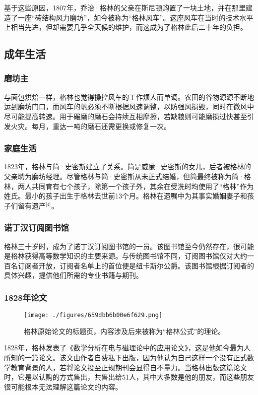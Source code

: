 基于这些原因，1807年，乔治·格林的父亲在斯尼顿购置了一块土地，并在那里建造了一座“砖结构风力磨坊”，如今被称为“格林风车”。这座风车在当时的技术水平上相当先进，但却需要几乎全天候的维护，而这成为了格林此后二十年的负担。
\subsection{成年生活}
\subsubsection{磨坊主}
与面包烘焙一样，格林也觉得操控风车的工作烦人而单调。农田的谷物源源不断地运到磨坊门口，而风车的帆必须不断根据风速调整，以防强风损毁，同时在微风中尽可能提高转速。用于碾磨的磨石会持续互相摩擦，若缺粮则可能磨损过快甚至引发火灾。每月，重达一吨的磨石还需更换或修复一次。
\subsubsection{家庭生活}
1823年，格林与简·史密斯建立了关系。简是威廉·史密斯的女儿，后者被格林的父亲聘为磨坊经理。尽管格林与简·史密斯从未正式结婚，但简最终被称为简·格林，两人共同育有七个孩子，除第一个孩子外，其余在受洗时均使用了“格林”作为姓氏。最小的孩子出生于格林去世前13个月。格林在遗嘱中为其事实婚姻妻子和孩子们留有遗产\(^\text{[4]}\)。
\subsubsection{诺丁汉订阅图书馆}
格林三十岁时，成为了诺丁汉订阅图书馆的一员。该图书馆至今仍然存在，很可能是格林获得高等数学知识的主要来源。与传统图书馆不同，订阅图书馆仅对大约一百名订阅者开放，订阅者名单上的首位便是纽卡斯尔公爵。该图书馆根据订阅者的具体兴趣，提供他们所需的专业书籍与期刊。
\subsubsection{1828年论文}
\begin{figure}[ht]
\centering
\texttt{[image: ./figures/659dbb6b00e6f629.png]}
\caption{格林原始论文的标题页，内容涉及后来被称为“格林公式”的理论。} \label{fig_QZgl_2}
\end{figure}
1828年，格林发表了《数学分析在电与磁理论中的应用论文》，这是他如今最为人所知的一篇论文。该文由作者自费私下出版，因为他认为自己这样一个没有正式数学教育背景的人，若将论文投至正规期刊会显得自不量力。当格林出版这篇论文时，它是以认购的方式售出，共售出给51人，其中大多数是他的朋友，而这些朋友很可能根本无法理解这篇论文的内容。


